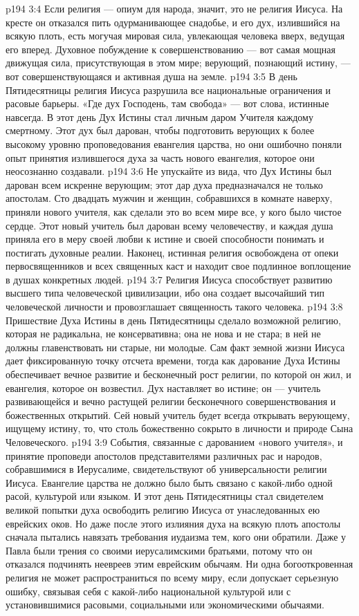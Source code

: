 \vs p194 3:4 Если религия --- опиум для народа, значит, это не религия Иисуса. На кресте он отказался пить одурманивающее снадобье, и его дух, излившийся на всякую плоть, есть могучая мировая сила, увлекающая человека вверх, ведущая его вперед. Духовное побуждение к совершенствованию --- вот самая мощная движущая сила, присутствующая в этом мире; верующий, познающий истину, --- вот совершенствующаяся и активная душа на земле.
\vs p194 3:5 В день Пятидесятницы религия Иисуса разрушила все национальные ограничения и расовые барьеры. «Где дух Господень, там свобода» --- вот слова, истинные навсегда. В этот день Дух Истины стал личным даром Учителя каждому смертному. Этот дух был дарован, чтобы подготовить верующих к более высокому уровню проповедования евангелия царства, но они ошибочно поняли опыт принятия излившегося духа за часть нового евангелия, которое они неосознанно создавали.
\vs p194 3:6 \pc Не упускайте из вида, что Дух Истины был дарован всем искренне верующим; этот дар духа предназначался не только апостолам. Сто двадцать мужчин и женщин, собравшихся в комнате наверху, приняли нового учителя, как сделали это во всем мире все, у кого было чистое сердце. Этот новый учитель был дарован всему человечеству, и каждая душа приняла его в меру своей любви к истине и своей способности понимать и постигать духовные реалии. Наконец, истинная религия освобождена от опеки первосвященников и всех священных каст и находит свое подлинное воплощение в душах конкретных людей.
\vs p194 3:7 \pc Религия Иисуса способствует развитию высшего типа человеческой цивилизации, ибо она создает высочайший тип человеческой личности и провозглашает священность такого человека.
\vs p194 3:8 Пришествие Духа Истины в день Пятидесятницы сделало возможной религию, которая не радикальна, не консервативна; она не нова и не стара; в ней не должны главенствовать ни старые, ни молодые. Сам факт земной жизни Иисуса дает фиксированную точку отсчета времени, тогда как дарование Духа Истины обеспечивает вечное развитие и бесконечный рост религии, по которой он жил, и евангелия, которое он возвестил. Дух наставляет во  истине; он --- учитель развивающейся и вечно растущей религии бесконечного совершенствования и божественных открытий. Сей новый учитель будет всегда открывать верующему, ищущему истину, то, что столь божественно сокрыто в личности и природе Сына Человеческого.
\vs p194 3:9 События, связанные с дарованием «нового учителя», и принятие проповеди апостолов представителями различных рас и народов, собравшимися в Иерусалиме, свидетельствуют об универсальности религии Иисуса. Евангелие царства не должно было быть связано с какой\hyp{}либо одной расой, культурой или языком. И этот день Пятидесятницы стал свидетелем великой попытки духа освободить религию Иисуса от унаследованных ею еврейских оков. Но даже после этого излияния духа на всякую плоть апостолы сначала пытались навязать требования иудаизма тем, кого они обратили. Даже у Павла были трения со своими иерусалимскими братьями, потому что он отказался подчинять неевреев этим еврейским обычаям. Ни одна богооткровенная религия не может распространиться по всему миру, если допускает серьезную ошибку, связывая себя с какой\hyp{}либо национальной культурой или с установившимися расовыми, социальными или экономическими обычаями.
